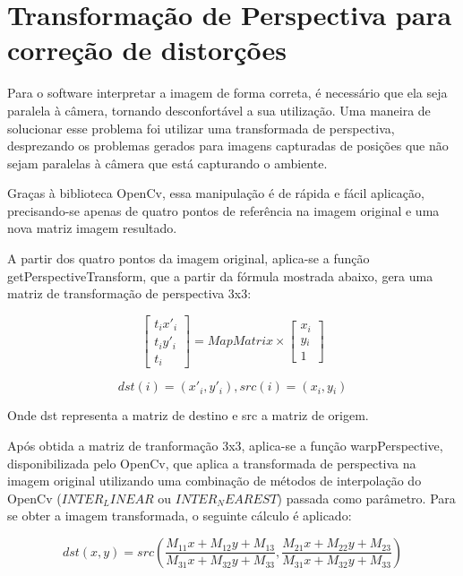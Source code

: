 \documentclass[12pt]{report}
\begin{document}
\section{Transformação de Perspectiva para correção de distorções}
\label{sec:perspectiva}

Para o software interpretar a imagem de forma correta, é necessário que ela seja paralela à câmera, tornando desconfortável a sua utilização. Uma maneira de solucionar esse problema foi utilizar uma transformada de perspectiva, desprezando os problemas gerados para imagens capturadas de posições que não sejam paralelas à câmera que está capturando o ambiente.

Graças à biblioteca OpenCv, essa manipulação é de rápida e fácil aplicação, precisando-se apenas de quatro pontos de referência na imagem original e uma nova matriz imagem resultado.

A partir dos quatro pontos da imagem original, aplica-se a função getPerspectiveTransform, que a partir da fórmula mostrada abaixo, gera uma matriz de transformação de perspectiva 3x3:

\begin{equation}
  \begin{bmatrix}
    t{}_i x'{}_i \\
    t{}_i y'{}_i \\
    t{}_i
  \end{bmatrix} = MapMatrix \times
  \begin{bmatrix}
    x{}_i \\
    y{}_i \\
    1
  \end{bmatrix}
\end{equation}

\begin{equation}
  dst(i) = (x'{}_i,y'{}_i), src(i) = (x{}_i,y{}_i)
\end{equation}

Onde dst representa a matriz de destino e src a matriz de origem.

Após obtida a matriz de tranformação 3x3, aplica-se a função warpPerspective, disponibilizada pelo OpenCv, que aplica a transformada de perspectiva na imagem original utilizando uma combinação de métodos de interpolação do OpenCv ({\it $INTER_LINEAR$} ou {\it $INTER_NEAREST$}) passada como parâmetro. Para se obter a imagem transformada, o seguinte cálculo é aplicado:

\begin{equation}
dst(x, y) = src \left(\dfrac{M_{11} x + M_{12} y + M_{13}}{M_{31} x + M_{32} y + M_{33}}, \dfrac{M_{21} x + M_{22} y + M_{23}}{M_{31} x + M_{32} y + M_{33}}\right)
\end{equation}
\end{document}
